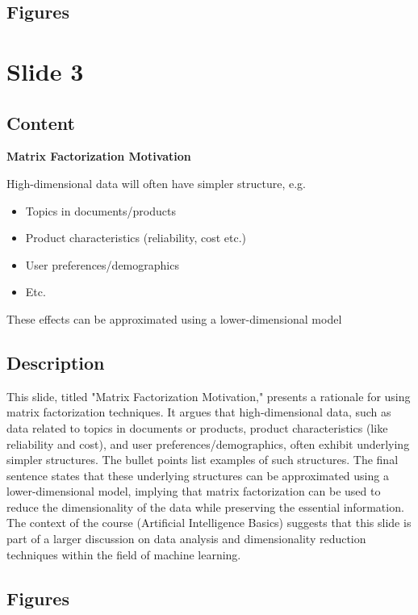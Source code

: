 \documentclass{article}%
\begin{document}
\subsection{Figures}%
\begin{figure}[H]%
\centering%
\end{figure}

%
\newpage%
\section{Slide 3}%
\label{sec:Slide3}%
\subsection{Content}%

\textbf{Matrix Factorization Motivation}

High-dimensional data will often have simpler structure, e.g.
\begin{itemize}
    \item Topics in documents/products
    \item Product characteristics (reliability, cost etc.)
    \item User preferences/demographics
    \item Etc.
\end{itemize}
These effects can be approximated using a lower-dimensional model
%
\subsection{Description}%
This slide, titled "Matrix Factorization Motivation," presents a rationale for using matrix factorization techniques.  It argues that high-dimensional data, such as data related to topics in documents or products, product characteristics (like reliability and cost), and user preferences/demographics, often exhibit underlying simpler structures.  The bullet points list examples of such structures.  The final sentence states that these underlying structures can be approximated using a lower-dimensional model, implying that matrix factorization can be used to reduce the dimensionality of the data while preserving the essential information.  The context of the course (Artificial Intelligence Basics) suggests that this slide is part of a larger discussion on data analysis and dimensionality reduction techniques within the field of machine learning.%
\subsection{Figures}%
\begin{figure}[H]%
\centering%
\end{figure}
\end{document}
